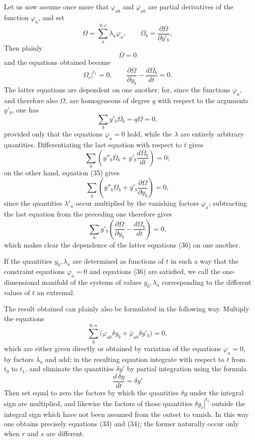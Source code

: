 \documentclass[11pt,a4paper,leqno]{article}
\begin{document}
Let us now assume once more that $\varphi_{ab}$ and $\overline{\varphi}_{ab}$ are partial derivatives of the function $\varphi_a$, and set
\[
\Omega=\sum_a^{0,r}\lambda_a\varphi_a,
\qquad
\Omega_b=\frac{\partial\Omega}{\partial y'_b},
\]
Then plainly
\begin{equation}\tag{35}
\Omega=0
\end{equation}
and the equations obtained become
\begin{equation}\tag{36}
\left.\Omega_c\right|^{t_1}=0,
\qquad
\frac{\partial\Omega}{\partial y_b}-\frac{d\Omega_b}{dt}=0.
\end{equation}
The latter equations are dependent on one another; for, since the functions $\varphi_a$, and therefore also $\Omega$, are homogeneous of degree $q$ with respect to the arguments $y'_b$, one has
\begin{equation}\tag{37}
\sum_b y'_b\Omega_b=q\Omega=0,
\end{equation}
provided only that the equations $\varphi_a=0$ hold, while the $\lambda$ are entirely arbitrary quantities. Differentiating the last equation with respect to $t$ gives
\[
\sum_b\left(y''_b\Omega_b+y'_b\frac{d\Omega_b}{dt}\right)=0;
\]
on the other hand, equation (35) gives
\[
\sum_b\left(y''_b\Omega_b+y'_b\frac{\partial\Omega}{\partial y_b}\right)=0,
\]
since the quantities $\lambda'_a$ occur multiplied by the vanishing factors $\varphi_a$; subtracting the last equation from the preceding one therefore gives
\begin{equation}\tag{38}
\sum_b y'_b
\left(
\frac{\partial\Omega}{\partial y_b}-\frac{d\Omega_b}{dt}
\right)=0,
\end{equation}
which makes clear the dependence of the latter equations (36) on one another.

If the quantities $y_b,\lambda_a$ are determined as functions of $t$ in such a way that the constraint equations $\varphi_a=0$ and equations (36) are satisfied, we call the one-dimensional manifold of the systems of values $y_b,\lambda_a$ corresponding to the different values of $t$ an extremal.

The result obtained can plainly also be formulated in the following way. Multiply the equations
\[
\sum_b^{0,n}\bigl(\varphi_{ab}\delta y_b+\overline{\varphi}_{ab}\delta y'_b\bigr)=0,
\]
which are either given directly or obtained by variation of the equations $\varphi_a=0$, by factors $\lambda_a$ and add; in the resulting equation integrate with respect to $t$ from $t_0$ to $t_1$, and eliminate the quantities $\delta y'$ by partial integration using the formula
\[
\frac{d\,\delta y}{dt}=\delta y'
\]
Then set equal to zero the factors by which the quantities $\delta y$ under the integral sign are multiplied, and likewise the factors of those quantities $\left.\delta y_c\right|^{t_1}$ outside the integral sign which have not been assumed from the outset to vanish. In this way one obtains precisely equations (33) and (34); the former naturally occur only when $r$ and $s$ are different.
\end{document}
